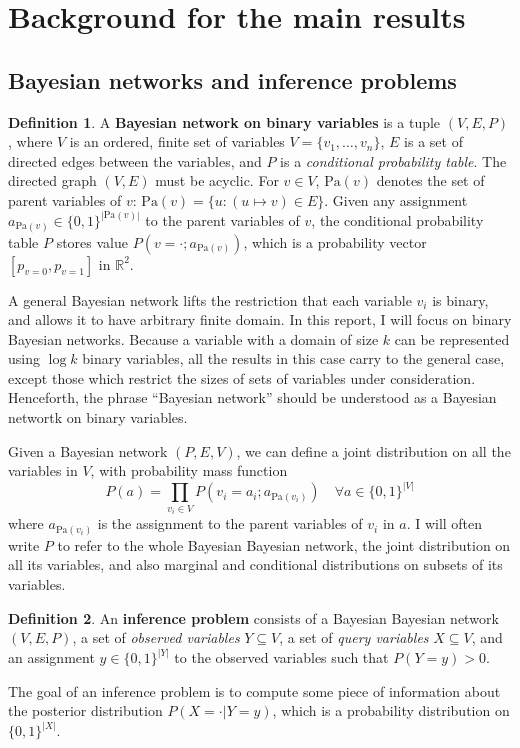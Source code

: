 \documentclass{article}
\theoremstyle{definition}
\newtheorem{defn}{Definition}
\theoremstyle{remark}
\def \Pa{\text{Pa}}
\begin{document}
\section{Background for the main results} \label{sec:background}

\subsection{Bayesian networks and inference problems}
\begin{defn}
A \textbf{Bayesian network on binary variables} is a tuple $(V, E, P)$, where $V$ is an ordered, finite set of variables $V = \{v_1, \dots, v_n\}$, $E$ is a set of directed edges between the variables, and $P$ is a \textit{conditional probability table}.
The directed graph $(V, E)$ must be acyclic.
For $v \in V$, $\Pa(v)$ denotes the set of parent variables of $v$: $\Pa(v) = \{u : (u \mapsto v) \in E\}$.
Given any assignment $a_{\Pa(v)} \in \{0, 1\}^{|\Pa(v)|}$ to the parent variables of $v$, the conditional probability table $P$ stores value $P(v = \cdot ; a_{\Pa(v)})$, which is a probability vector $[p_{v=0}, p_{v=1}]$ in $\mathbb{R}^2$.
\end{defn}

A general Bayesian network lifts the restriction that each variable $v_i$ is binary, and allows it to have arbitrary finite domain.
In this report, I will focus on binary Bayesian networks. Because a variable with a domain of size $k$ can be represented using $\log k$ binary variables, all the results in this case carry to the general case, except those which restrict the sizes of sets of variables under consideration.
Henceforth, the phrase ``Bayesian network'' should be understood as a Bayesian networtk on binary variables.

Given a Bayesian network $(P, E, V)$, we can define a joint distribution on all the variables in $V$, with probability mass function
$$
P(a) = \prod_{v_i \in V}{P(v_i = a_i ; a_{\Pa(v_i)})} \quad \forall a \in \{0, 1\}^{|V|}
$$
where $a_{\Pa(v_i)}$ is the assignment to the parent variables of $v_i$ in $a$.
I will often write $P$ to refer to the whole Bayesian Bayesian network, the joint distribution on all its variables, and also marginal and conditional distributions on subsets of its variables.

\begin{defn}
An \textbf{inference problem} consists of a Bayesian Bayesian network $(V, E, P)$, a set of \textit{observed variables} $Y \subseteq V$, a set of \textit{query variables} $X \subseteq V$, and an assignment $y \in \{0, 1\}^{|Y|}$ to the observed variables such that $P(Y = y) > 0$.
\end{defn}
The goal of an inference problem is to compute some piece of information about the posterior distribution $P(X = \cdot | Y = y)$, which is a probability distribution on $\{0, 1\}^{|X|}$.
\end{document}
